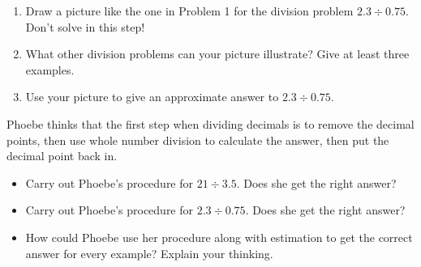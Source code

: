\documentclass{ximera}
\begin{document}
\begin{problem}
\begin{enumerate}
\item Draw a picture like the one in Problem 1 for the division problem  $2.3 \div 0.75$.  Don't solve in this step!
\item What other division problems can your picture illustrate?  Give at least three examples.
\item Use your picture to give an approximate answer to  $2.3 \div 0.75$.
\end{enumerate}
\end{problem}



\begin{problem}
Phoebe thinks that the first step when dividing decimals is to remove the decimal points, then use whole number division to calculate the answer, then put the decimal point back in.

\begin{itemize}
	\item Carry out Phoebe's procedure for $21 \div 3.5$. Does she get the right answer?
	\item Carry out Phoebe's procedure for $2.3 \div 0.75$. Does she get the right answer?
	\item How could Phoebe use her procedure along with estimation to get the correct answer for every example? Explain your thinking.
\end{itemize}
\end{problem}
\end{document}
